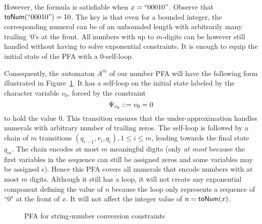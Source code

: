 \documentclass[sigplan,review,anonymous]{acmart}\settopmatter{printfolios=true,printccs=false,printacmref=false}
\begin{document}
However, the formula is satisfiable when $x=``00010"$. Observe that $\mbox{\textsf{toNum}($``00010"$)}=10$. The key is that even for a bounded integer, the corresponding numeral can be of an unbounded length with arbitrarily many trailing `$0$'s at the front. All numbers with up to $m$-digits can be however still handled without having to solve exponential constraints. It is enough to equip the initial state of the PFA with a  $0$-self-loop.

Consequently, the automaton $A^m$ of our number PFA will have the following form illustrated in Figure~\ref{fig:sfa_its}. 
It has a self-loop on the initial state labeled by the character variable $v_0$, 
forced by the constraint 
$$
\Psi_{v_0}::= v_0=0
$$ 
to hold the value $0$. 
This transition ensures that the under-approximation handles numerals with arbitrary number of trailing zeros.  
The self-loop is followed by a chain of $m$ transitions $(q_{i-1},v_i,q_{i}),1\leq i \leq m$, leading towards the final state $q_m$. 
The chain encodes at most $m$ meaningful digits (only \emph{at most} because the first variables in the sequence can still be assigned zeros and some variables may be assigned $\epsilon$). Hence this PFA covers all numerals that encode numbers with at most $m$ digits.
Although it still has a loop, it will not create any exponential component defining the value of $n$ because the loop only represents a sequence of ``0" at the front of $x$. It will not affect the integer value of $n=\mbox{\textsf{toNum}($x$)}$.

\begin{figure}
	
	\caption{PFA for string-number conversion constraints}
	\label{fig:sfa_its}
\end{figure}
\end{document}

